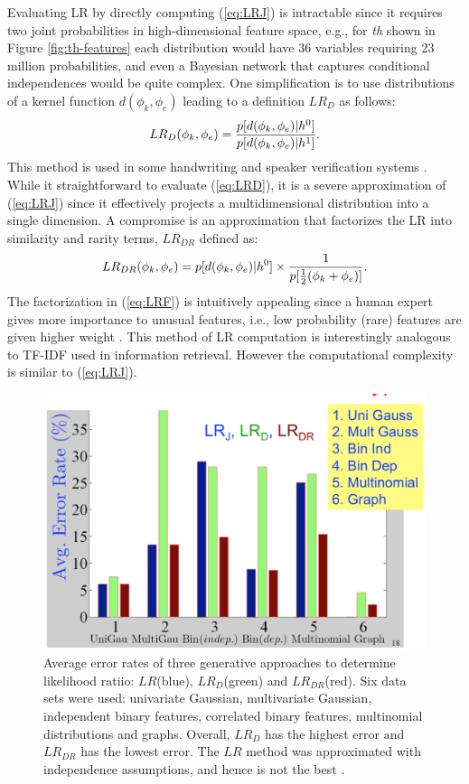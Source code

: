 \documentclass[11pt, doublespacing]{article}
\begin{document}
Evaluating LR by directly computing (\ref{eq:LRJ}) is intractable since it requires two joint probabilities in high-dimensional feature space, e.g., for {\em th} shown in Figure \ref{fig:th-features} each distribution would have 36 variables requiring 23 million probabilities, and even a Bayesian network that captures conditional independences \cite{Koller2009} would be quite complex. One simplification is to use distributions of a kernel function $d(\phi_{k},\phi_{e})$ leading to a definition $LR_D$ as follows:
\begin{equation}
 LR_{D}(\phi_{k},\phi_{e})=\frac{p[d({\bf \phi}_{k},{\bf \phi}_{e}) |h^{0}]} 
{p[d({\bf \phi}_{k} ,{\bf \phi}_{e}) |h^{1}]}.
\label{eq:LRD}
\end{equation} 
This method is used in some handwriting and speaker verification systems \cite{Srihari2007}. While it straightforward to evaluate (\ref{eq:LRD}), it is a severe approximation of (\ref{eq:LRJ}) since it  effectively projects a multidimensional distribution into a single dimension. A compromise is an approximation that factorizes the LR  into similarity and rarity terms,  $LR_{DR}$ \cite{Lindley1977,Tang-Srihari14} defined as:
\begin{equation}
 LR_{DR}(\phi_{k},\phi_{e})={p[d({\bf \phi}_k,{\bf \phi}_e)|h^{0}]} \times \frac 1{p[{\frac 12} ({\bf \phi}_k + {\bf \phi}_{e})] }.
\label{eq:LRF}
\end{equation} 
The factorization in (\ref{eq:LRF}) is intuitively appealing since a human expert gives more importance to unusual features, i.e.,  low probability  (rare) features are given higher weight \cite{Su2010}. This method of LR computation is interestingly analogous to TF-IDF used in information retrieval. However the computational complexity is similar to (\ref{eq:LRJ}).


\begin{figure}
\centering
\includegraphics [width=0.3\linewidth]{Figures/LRperformance}
\caption{\small{Average error rates of three generative approaches to determine likelihood ratiio:  $LR$(blue), $LR_{D}$(green) and $LR_{DR}$(red). Six data sets were used: univariate Gaussian, multivariate Gaussian, independent binary features, correlated binary features, multinomial distributions and graphs. Overall, $LR_D$ has the highest error and  $LR_{DR}$  has the lowest error. The $LR$ method was approximated with independence assumptions, and hence is not the best \cite{Tang-Srihari14}.}}
\label{fig:LRperformance}
\end{figure}
\end{document}
